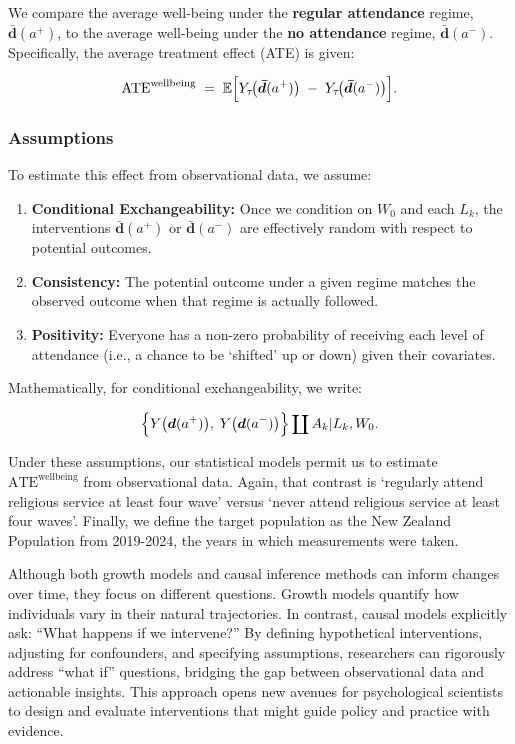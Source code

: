 \documentclass[
  single column]{article}
\providecommand{\tightlist}{%
  \setlength{\itemsep}{0pt}\setlength{\parskip}{0pt}}\usepackage{longtable,booktabs,array}
\begin{document}
We compare the average well-being under the \textbf{regular attendance}
regime, \(\boldsymbol{\bar{d}}(a^+)\), to the average well-being under
the \textbf{no attendance} regime, \(\boldsymbol{\bar{d}}(a^-)\).
Specifically, the average treatment effect (ATE) is given:

\[
\text{ATE}^{\text{wellbeing}} 
\;=\; 
\mathbb{E}
\Bigl[
  Y_\tau\!\bigl(\boldsymbol{\bar{d}}(a^+)\bigr) 
  \;-\; 
  Y_\tau\!\bigl(\boldsymbol{\bar{d}}(a^-)\bigr)
\Bigr].
\]

\subsubsection{Assumptions}\label{assumptions}

To estimate this effect from observational data, we assume:

\begin{enumerate}
\def\labelenumi{\arabic{enumi}.}
\tightlist
\item
  \textbf{Conditional Exchangeability:} Once we condition on \(W_0\) and
  each \(L_k\), the interventions \(\boldsymbol{\bar{d}}(a^+)\) or
  \(\boldsymbol{\bar{d}}(a^-)\) are effectively random with respect to
  potential outcomes.
\item
  \textbf{Consistency:} The potential outcome under a given regime
  matches the observed outcome when that regime is actually followed.
\item
  \textbf{Positivity:} Everyone has a non-zero probability of receiving
  each level of attendance (i.e., a chance to be `shifted' up or down)
  given their covariates.
\end{enumerate}

Mathematically, for conditional exchangeability, we write:

\[
\Bigl\{
  Y\bigl(\boldsymbol{d}(a^+)\bigr), 
  \; 
  Y\bigl(\boldsymbol{d}(a^-)\bigr)
\Bigr\}
\coprod
A_k |
L_k,
W_0.
\]

Under these assumptions, our statistical models permit us to estimate
\(\text{ATE}^{\text{wellbeing}}\) from observational data. Again, that
contrast is `regularly attend religious service at least four wave'
versus `never attend religious service at least four waves'. Finally, we
define the target population as the New Zealand Population from
2019-2024, the years in which measurements were taken.

Although both growth models and causal inference methods can inform
changes over time, they focus on different questions. Growth models
quantify how individuals vary in their natural trajectories. In
contrast, causal models explicitly ask: ``What happens if we
intervene?'' By defining hypothetical interventions, adjusting for
confounders, and specifying assumptions, researchers can rigorously
address ``what if'' questions, bridging the gap between observational
data and actionable insights. This approach opens new avenues for
psychological scientists to design and evaluate interventions that might
guide policy and practice with evidence.
\end{document}
